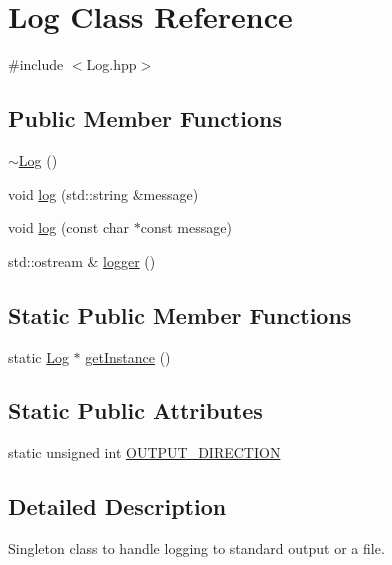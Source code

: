 \hypertarget{classLog}{}\section{Log Class Reference}
\label{classLog}


{\ttfamily \#include $<$Log.\+hpp$>$}

\subsection*{Public Member Functions}
\begin{DoxyCompactItemize}
\item 
\mbox{\hyperlink{classLog_a0fbfda88fbee5027c89f6eb121059360}{$\sim$\+Log}} ()
\item 
void \mbox{\hyperlink{classLog_ac4365b77dc0b64c77e577888dfab5099}{log}} (std\+::string \&message)
\item 
void \mbox{\hyperlink{classLog_a60929e600b7759e97ea623ea5b05971e}{log}} (const char $\ast$const message)
\item 
std\+::ostream \& \mbox{\hyperlink{classLog_a32d048a4924c7851c4b7b16758675af6}{logger}} ()
\end{DoxyCompactItemize}
\subsection*{Static Public Member Functions}
\begin{DoxyCompactItemize}
\item 
static \mbox{\hyperlink{classLog}{Log}} $\ast$ \mbox{\hyperlink{classLog_a987f3ff401eea783d0e80daaea1d7aca}{get\+Instance}} ()
\end{DoxyCompactItemize}
\subsection*{Static Public Attributes}
\begin{DoxyCompactItemize}
\item 
static unsigned int \mbox{\hyperlink{classLog_a8928d01e0edbf98838c642e04e12458e}{O\+U\+T\+P\+U\+T\+\_\+\+D\+I\+R\+E\+C\+T\+I\+ON}}
\end{DoxyCompactItemize}


\subsection{Detailed Description}
Singleton class to handle logging to standard output or a file. 

